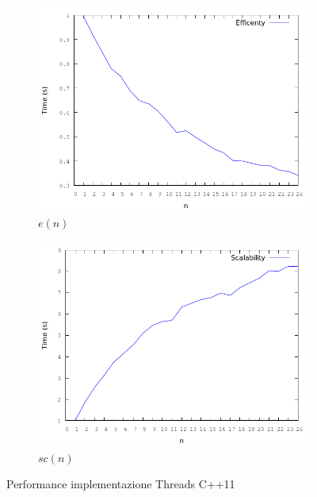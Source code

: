 \documentclass[12pt]{article}
\begin{document}
\begin{figure}[!htbp]
\begin{subfigure}{.55\textwidth}
  \includegraphics[scale=.35,keepaspectratio]{th_ef.png}
  \caption{$e(n)$}
  \label{fig:lsec}
\end{subfigure}
\begin{subfigure}{.55\textwidth}
  \centering
  \includegraphics[scale=.35,keepaspectratio]{th_sc.png}
  \caption{$sc(n)$}
  \label{fig:cacc}
\end{subfigure}
\caption{Performance implementazione Threads C++11}
\label{img:plotsth}
\end{figure}
\end{document}
